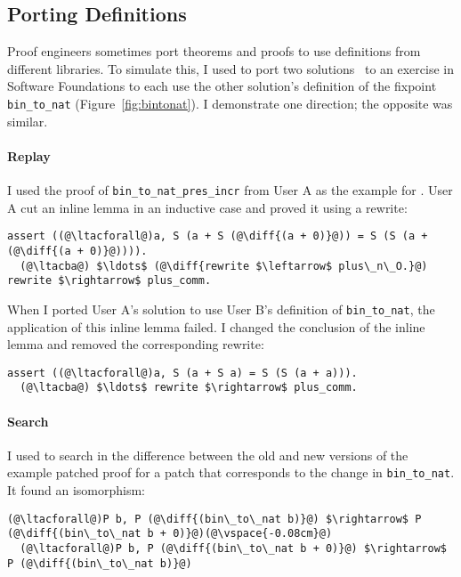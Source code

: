 \subsection{Porting Definitions}
\label{sec:foundations}

Proof engineers sometimes port theorems and proofs to use definitions from different libraries.
To simulate this, I used \sysname to port two solutions~\cite{usera, userb}
to an exercise in Software Foundations to each use the other solution's definition of the fixpoint \lstinline{bin_to_nat} (Figure~\ref{fig:bintonat}).
I demonstrate one direction; the opposite was similar.

\paragraph{Replay} I used the proof of \lstinline{bin_to_nat_pres_incr} from User A as the example for \sysname.
User A cut an inline lemma in an inductive case and proved it using a rewrite:

\begin{lstlisting}[language=coq]
  assert ((@\ltacforall@)a, S (a + S (@\diff{(a + 0)}@)) = S (S (a + (@\diff{(a + 0)}@)))).
  (@\ltacba@) $\ldots$ (@\diff{rewrite $\leftarrow$ plus\_n\_O.}@) rewrite $\rightarrow$ plus_comm.
\end{lstlisting} %
When I ported User A's solution to use User B's definition of \lstinline{bin_to_nat}, 
the application of this inline lemma failed. I changed the conclusion of the inline lemma 
and removed the corresponding rewrite:

\begin{lstlisting}[language=coq]
  assert ((@\ltacforall@)a, S (a + S a) = S (S (a + a))).
  (@\ltacba@) $\ldots$ rewrite $\rightarrow$ plus_comm.
\end{lstlisting} %

\paragraph{Search} I used \sysname to search in the difference between the old and new versions of the example
patched proof for a patch that corresponds to the change in \lstinline{bin_to_nat}.
It found an isomorphism:

\begin{lstlisting}[language=coq]
  (@\ltacforall@)P b, P (@\diff{(bin\_to\_nat b)}@) $\rightarrow$ P (@\diff{(bin\_to\_nat b + 0)}@)(@\vspace{-0.08cm}@)
  (@\ltacforall@)P b, P (@\diff{(bin\_to\_nat b + 0)}@) $\rightarrow$ P (@\diff{(bin\_to\_nat b)}@)
\end{lstlisting}

